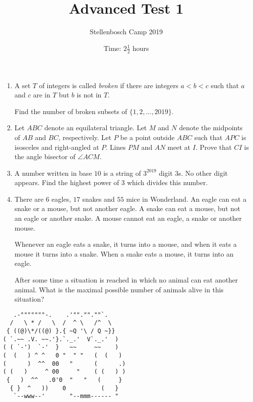 \documentclass{article}
\title{Advanced Test 1}
\author{Stellenbosch Camp 2019}
\date{Time: $2\frac{1}{2}$ hours}
\begin{document}
\maketitle
\thispagestyle{empty}


\begin{enumerate}[1.]

\item %
A set $T$ of integers is called \emph{broken} if there are integers $a < b < c$ such that $a$ and $c$ are in $T$ but $b$ is not in $T$.

Find the number of broken subsets of $\{1, 2, \dotsc, 2019\}$.


\item %
Let $ABC$ denote an equilateral triangle.
Let $M$ and $N$ denote the midpoints of $AB$ and $BC$, respectively.
Let $P$ be a point outside $ABC$ such that $APC$ is isosceles and right-angled at $P$.
Lines $PM$ and $AN$ meet at $I$.
Prove that $CI$ is the angle bisector of $\angle ACM$.


\item %
A number written in base $10$ is a string of $3^{2019}$ digit $3$s.
No other digit appears.
Find the highest power of $3$ which divides this number.


\item %
There are $6$ eagles, $17$ snakes and $55$ mice in Wonderland.
An eagle can eat a snake or a mouse, but not another eagle.
A snake can eat a mouse, but not an eagle or another snake.
A mouse cannot eat an eagle, a snake or another mouse.

Whenever an eagle eats a snake, it turns into a mouse, and when it eats a mouse it turns into a snake. When a snake eats a mouse, it turns into an eagle.

After some time a situation is reached in which no animal can eat another animal.
What is the maximal possible number of animals alive in this situation?




\end{enumerate}


\vfill
\centering
\begin{BVerbatim}
   .-"""""""-.    .'""."".""`.
  /   \ * /   \  /  ^ \   /^  \
 { ((@)\*/((@) }.{ ~Q '\ / Q ~}}
( `.~~ .V. ~~.'}.`._.'  V`._.'  )
( ( `-')  `-'  }   ~~     ~~    )
(  (   ) ^ ^   0 "  " "   (  (   )
(      )  ^^  00   "      (      .)
( (   )     ^ 00     "    ( (   ) )
 {   )  ^^   .0'0  "   "   (     }
  { }  ^   ))    0          (   }
   `--www--'       "--mmm------ "    
\end{BVerbatim}
\end{document}
